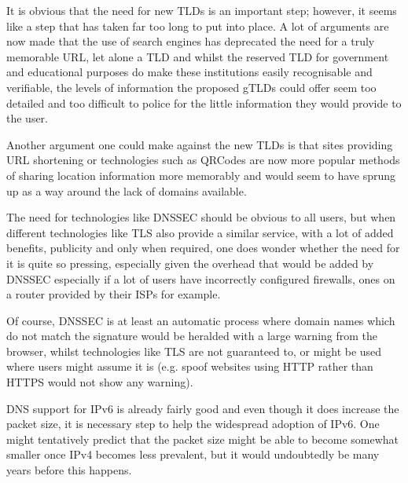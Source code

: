 \documentclass[11pt, a4paper]{article}
\begin{document}
It is obvious that the need for new \glspl{TLD} is an important step; however, 
it seems like a step that has taken far too long to put into place. A lot of
arguments are now made that the use of search engines has deprecated the need
for a truly memorable \gls{URL}, let alone a \gls{TLD} and whilst the reserved
\gls{TLD} for government and educational purposes do make these institutions
easily recognisable and verifiable, the levels of information the proposed 
\glspl{gTLD} could offer seem too detailed and too difficult to police for the
little information they would provide to the user.

Another argument one could make against the new \glspl{TLD} is that sites 
providing \gls{URL} shortening or technologies such as \glspl{QRCode} are now
more popular methods of sharing location information more memorably and would
seem to have sprung up as a way around the lack of domains available.

The need for technologies like \gls{DNSSEC} should be obvious to all users, but
when different technologies like \gls{TLS} also provide a similar service, with
a lot of added benefits, publicity and only when required, one does wonder 
whether the need for it is quite so pressing, especially given the overhead that
would be added by \gls{DNSSEC} especially if a lot of users have incorrectly
configured firewalls, ones on a router provided by their \glspl{ISP} for 
example.

Of course, \gls{DNSSEC} is at least an automatic process where domain names 
which do not match the signature would be heralded with a large warning from
the browser, whilst technologies like \gls{TLS} are not guaranteed to, or might
be used where users might assume it is (e.g. spoof websites using HTTP rather 
than HTTPS would not show any warning).

\gls{DNS} support for IPv6 is already fairly good and even though it does 
increase the packet size, it is necessary step to help the widespread
adoption of IPv6. One might tentatively predict that the packet size might be
able to become somewhat smaller once IPv4 becomes less prevalent, but it would
undoubtedly be many years before this happens.

\newpage


\end{document}
